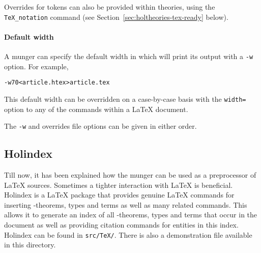 Overrides for \HOL{} tokens can also be provided within \HOL{}
theories, using the
\texttt{TeX\_notation} command (see
Section~\ref{sec:holtheories-tex-ready} below).

\paragraph{Default width}
A munger can specify the default width in which \HOL{} will print its
output with a \texttt{-w} option.
%
For example,
\begin{alltt}
   \munge -w70 < article.htex > article.tex
\end{alltt}
This default width can be overridden on a case-by-case basis with the
\texttt{width=} option to any of the commands within a \LaTeX{}
document.


\smallskip \noindent
The \texttt{-w} and overrides file options can be given in either
order.

\subsection{Holindex}

 Till now, it has been explained how the
munger can be used as a preprocessor of \LaTeX{} sources. Sometimes a
tighter interaction with \LaTeX{} is beneficial. Holindex is a
\LaTeX{} package that provides genuine \LaTeX{} commands for inserting
\HOL{}-theorems, types and terms as well as many related commands.
This allows it to generate an index of all \HOL{}-theorems, types and
terms that occur in the document as well as providing citation commands
for \HOL{} entities in this index. Holindex can be found in
\texttt{src/TeX/}. There is also a demonstration file available in this
directory.


